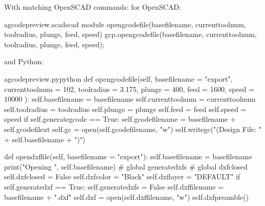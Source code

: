 \documentclass{ltxdoc}
\begin{document}
With matching OpenSCAD commands:  for OpenSCAD:

 
\lstset{firstnumber=\thegcpscad}
\begin{writecode}{a}{gcodepreview.scad}{scad}
module opengcodefile(basefilename, currenttoolnum, toolradius, plunge, feed, speed) {
    gcp.opengcodefile(basefilename, currenttoolnum, toolradius, plunge, feed, speed);
}

\end{writecode}
\addtocounter{gcpscad}{4}

\noindent and Python:

\lstset{firstnumber=\thegcpy}
\begin{writecode}{a}{gcodepreview.py}{python}
    def opengcodefile(self, basefilename = "export", 
                      currenttoolnum = 102, 
                      toolradius = 3.175, 
                      plunge = 400, 
                      feed = 1600, 
                      speed = 10000
                      ):
        self.basefilename = basefilename
        self.currenttoolnum = currenttoolnum
        self.toolradius = toolradius
        self.plunge = plunge
        self.feed = feed
        self.speed = speed
        if self.generategcode == True:
            self.gcodefilename = basefilename + self.gcodefilext
            self.gc = open(self.gcodefilename, "w")
            self.writegc("(Design File: " + self.basefilename + ")")

    def opendxffile(self, basefilename = "export"): 
        self.basefilename = basefilename
        print("Opening ", self.basefilename)
#        global generatedxfs
#        global dxfclosed
        self.dxfclosed = False
        self.dxfcolor = "Black"
        self.dxflayer = "DEFAULT"
        if self.generatedxf == True:
            self.generatedxfs = False
            self.dxffilename = basefilename + ".dxf"
            self.dxf = open(self.dxffilename, "w")
            self.dxfpreamble()

\end{writecode}
\addtocounter{gcpy}{32}
\end{document}

